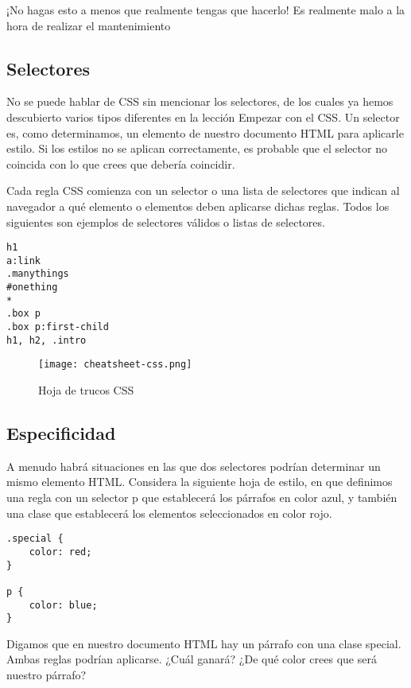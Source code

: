 \begin{remark}
¡No hagas esto a menos que realmente tengas que hacerlo! Es realmente malo a la hora de realizar el mantenimiento 
\end{remark}

\subsection{Selectores}
No se puede hablar de CSS sin mencionar los selectores, de los cuales ya hemos descubierto varios tipos diferentes en la lección Empezar con el CSS. Un selector es, como determinamos, un elemento de nuestro documento HTML para aplicarle estilo. Si los estilos no se aplican correctamente, es probable que el selector no coincida con lo que crees que debería coincidir.

Cada regla CSS comienza con un selector o una lista de selectores que indican al navegador a qué elemento o elementos deben aplicarse dichas reglas. Todos los siguientes son ejemplos de selectores válidos o listas de selectores.

\begin{lstlisting}
h1
a:link
.manythings
#onething
*
.box p
.box p:first-child
h1, h2, .intro
\end{lstlisting}

\begin{figure}[H]
	\center
	\texttt{[image: cheatsheet-css.png]}
	\caption{Hoja de trucos CSS}
	\label{fig:super}
\end{figure}

\subsection{Especificidad}
A menudo habrá situaciones en las que dos selectores podrían determinar un mismo elemento HTML. Considera la siguiente hoja de estilo, en que definimos una regla con un selector p que establecerá los párrafos en color azul, y también una clase que establecerá los elementos seleccionados en color rojo.

\begin{lstlisting}
.special {
	color: red;
}

p {
	color: blue;
}
\end{lstlisting}

Digamos que en nuestro documento HTML hay un párrafo con una clase special. Ambas reglas podrían aplicarse. ¿Cuál ganará? ¿De qué color crees que será nuestro párrafo?

